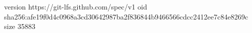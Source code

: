 version https://git-lfs.github.com/spec/v1
oid sha256:afe19f0d4c0968a3cd30642987ba2f836844b9466566cdcc2412ee7c84e8269c
size 35883
